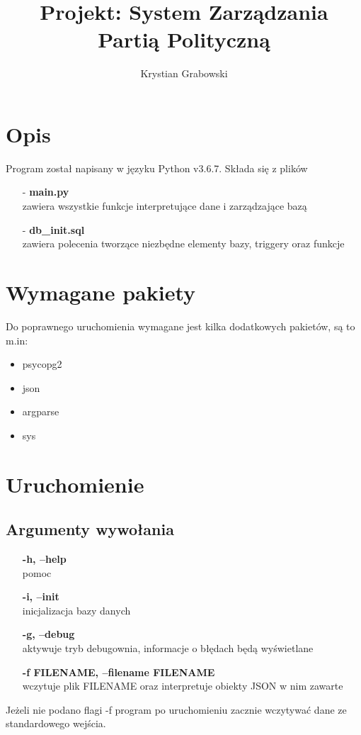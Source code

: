 \documentclass[a4paper]{article}
\title{Projekt: System Zarządzania Partią Polityczną}
\author{Krystian Grabowski}
\begin{document}
\maketitle
\section{Opis}
Program został napisany w języku Python v3.6.7. Składa się z plików
\begin{itemize}
    \itemsep0em
    \item[-] \textbf{main.py} \\ zawiera wszystkie funkcje interpretujące dane i zarządzające bazą
    \item[-] \textbf{db\_init.sql} \\ zawiera polecenia tworzące niezbędne elementy bazy, triggery oraz funkcje
\end{itemize}
  
\section{Wymagane pakiety}
Do poprawnego uruchomienia wymagane jest kilka dodatkowych pakietów, są to m.in:
\begin{itemize}
    \itemsep0em
    \item psycopg2
    \item json
    \item argparse
    \item sys
\end{itemize}


\section{Uruchomienie}
\subsection{Argumenty wywołania}
\begin{itemize}
    \itemsep0em
    \item[] \textbf{-h, --help} \\ pomoc
    \item[] \textbf{-i, --init} \\  inicjalizacja bazy danych
    \item[] \textbf{-g, --debug} \\  aktywuje tryb debugownia, 
        informacje o błędach będą wyświetlane
    \item[] \textbf{-f FILENAME, --filename FILENAME} \\ wczytuje plik FILENAME 
    oraz interpretuje obiekty JSON w nim zawarte
\end{itemize}
Jeżeli nie podano flagi -f program po uruchomieniu zacznie wczytywać dane ze standardowego wejścia.
\end{document}
